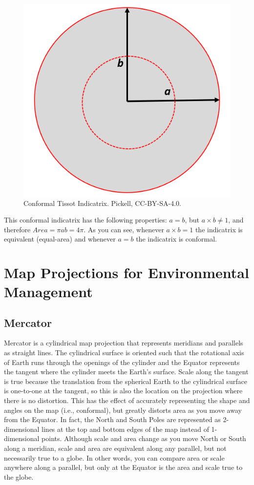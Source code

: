 \documentclass[
]{book}
\begin{document}
\begin{figure}
\includegraphics[width=0.75\linewidth]{images/02-conformal-indicatrix} \caption{Conformal Tissot Indicatrix. Pickell, CC-BY-SA-4.0.}\label{fig:2-conformal-indicatrix}
\end{figure}

This conformal indicatrix has the following properties: \(a=b\), but \(a×b≠1\), and therefore \(Area=πab=4π\). As you can see, whenever \(a×b=1\) the indicatrix is equivalent (equal-area) and whenever \(a=b\) the indicatrix is conformal.

\hypertarget{map-projections-for-environmental-management}{%
\section{Map Projections for Environmental Management}\label{map-projections-for-environmental-management}}

\hypertarget{mercator}{%
\subsection{Mercator}\label{mercator}}

Mercator is a cylindrical map projection that represents meridians and parallels as straight lines. The cylindrical surface is oriented such that the rotational axis of Earth runs through the openings of the cylinder and the Equator represents the tangent where the cylinder meets the Earth's surface. Scale along the tangent is true because the translation from the spherical Earth to the cylindrical surface is one-to-one at the tangent, so this is also the location on the projection where there is no distortion. This has the effect of accurately representing the shape and angles on the map (i.e., conformal), but greatly distorts area as you move away from the Equator. In fact, the North and South Poles are represented as 2-dimensional lines at the top and bottom edges of the map instead of 1-dimensional points. Although scale and area change as you move North or South along a meridian, scale and area are equivalent along any parallel, but not necessarily true to a globe. In other words, you can compare area or scale anywhere along a parallel, but only at the Equator is the area and scale true to the globe.
\end{document}
